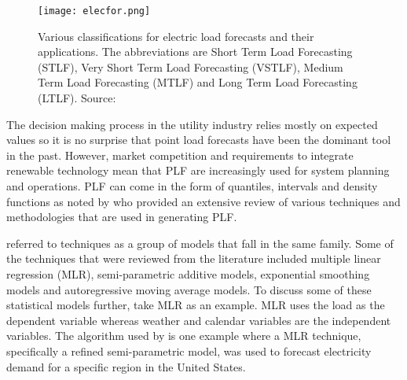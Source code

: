 \begin{figure}
\centering
\texttt{[image: elecfor.png]}
\caption{Various classifications for electric load forecasts and their applications. The abbreviations are Short Term Load Forecasting (STLF), Very Short Term Load Forecasting (VSTLF), Medium Term Load Forecasting (MTLF) and Long Term Load Forecasting (LTLF). Source: \citet{hong16}}
\label{fig:elecfor} 
\end{figure}

The decision making process in the utility industry relies mostly on expected values so it is no surprise that point load forecasts have been the dominant tool in the past. However, market competition and requirements to integrate renewable technology mean that PLF are increasingly used for system planning and operations. PLF can come in the form of quantiles, intervals and density functions as noted by \citet{hong16} who provided an extensive review of various techniques and methodologies that are used in generating PLF. 

\citet{hong16} referred to techniques as a group of models that fall in the same family. Some of the techniques that were reviewed from the literature included multiple linear regression (MLR), semi-parametric additive models, exponential smoothing models and autoregressive moving average models. To discuss some of these statistical models further, take MLR as an example. MLR uses the load as the dependent variable whereas weather and calendar variables are the independent variables. The algorithm used by \citet{char14} is one example where a MLR technique, specifically a refined semi-parametric model, was used to forecast electricity demand for a specific region in the United States. %

